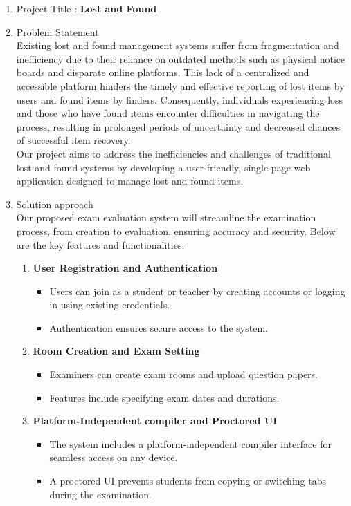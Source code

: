 \documentclass[14pt]{article}
\begin{document}
\begin{enumerate}
\item Project Title : \textbf{Lost and Found}
\item Problem Statement \\
\tabto{.5cm}Existing lost and found management systems suffer from fragmentation and
inefficiency due to their reliance on outdated methods such as physical notice
boards and disparate online platforms. This lack of a centralized and accessible
platform hinders the timely and effective reporting of lost items by users and found
items by finders. Consequently, individuals experiencing loss and those who have
found items encounter difficulties in navigating the process, resulting in prolonged
periods of uncertainty and decreased chances of successful item recovery.\\
\tabto{.5cm} Our project aims to address the inefficiencies and challenges of traditional lost and found systems by developing a user-friendly, single-page web application designed to manage lost and found items.
\item Solution approach \\
\tabto{.5cm}Our proposed exam evaluation system will streamline the examination process, from creation to evaluation, ensuring accuracy and security. Below are the key features and functionalities.
\begin{enumerate}
\item \textbf{User Registration and Authentication}
\begin{itemize}
\item Users can join as a student or teacher by creating accounts or logging in using existing credentials.
\item Authentication ensures secure access to the system.
\end{itemize}
\item \textbf{Room Creation and Exam Setting}
\begin{itemize}
\item Examiners can create exam rooms and upload question papers.
\item Features include specifying exam dates and durations.
\end{itemize}
\item \textbf{Platform-Independent compiler and Proctored UI}
\begin{itemize}
\item The system includes a platform-independent compiler interface for seamless access on any device.
\item A proctored UI prevents students from copying or switching tabs during the examination.

\end{itemize}
\end{enumerate}
\end{enumerate}
\end{document}
